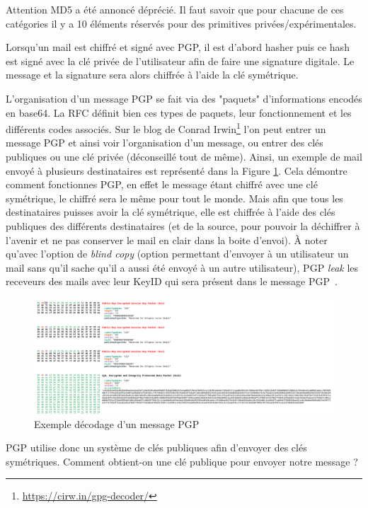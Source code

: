 Attention MD5 a été annoncé déprécié. Il faut savoir que pour chacune de ces catégories il y a 10 éléments réservés pour des primitives privées/expérimentales.

Lorsqu'un mail est chiffré et signé avec PGP, il est d'abord hasher puis ce hash est signé avec la clé privée de l'utilisateur afin de faire une signature digitale. Le message et la signature sera alors chiffrée à l'aide la clé symétrique.

L'organisation d'un message PGP se fait via des "paquets" d'informations encodés en base64. La RFC définit bien ces types de paquets, leur fonctionnement et les différents codes associés. Sur le blog de Conrad Irwin\footnote{\url{https://cirw.in/gpg-decoder/}} l'on peut entrer un message PGP et ainsi voir l'organisation d'un message, ou entrer des clés publiques ou une clé privée (déconseillé tout de même). Ainsi, un exemple de mail envoyé à plusieurs destinataires est représenté dans la Figure \ref{fig:PGP_DECODE}. Cela démontre comment fonctionnes PGP, en effet le message étant chiffré avec une clé symétrique, le chiffré sera le même pour tout le monde. Mais afin que tous les destinataires puisses avoir la clé symétrique, elle est chiffrée à l'aide des clés publiques des différents destinataires (et de la source, pour pouvoir la déchiffrer à l'avenir et ne pas conserver le mail en clair dans la boite d'envoi). À noter qu'avec l'option de \textit{blind copy} (option permettant d'envoyer à un utilisateur un mail sans qu'il sache qu'il a aussi été envoyé à un autre utilisateur), PGP \textit{leak} les receveurs des mails avec leur KeyID qui sera présent dans le message PGP~\cite{BccPrivacy}.

\begin{figure}[h!]
	\includegraphics[width=14cm]{images/examplePGPDecode.png}
	\centering
	\caption{Exemple décodage d'un message PGP}
	\label{fig:PGP_DECODE}
\end{figure}

PGP utilise donc un système de clés publiques afin d'envoyer des clés symétriques. Comment obtient-on une clé publique pour envoyer notre message ?

